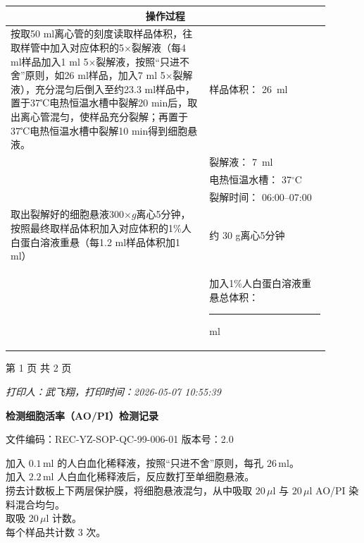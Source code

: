 \documentclass[UTF8,10pt,a4paper,fontset=fandol]{ctexart}
\newcommand{\fieldvalue}[1]{#1}
\newcommand{\handwritten}[1]{#1}
\begin{document}
\begin{tabular}{|p{0.56\linewidth}|p{0.34\linewidth}|}
\hline
\multicolumn{2}{|c|}{操作过程}\\
\hline
按取50 ml离心管的刻度读取样品体积，往取样管中加入对应体积的5$\times$裂解液（每4 ml样品加入1 ml 5$\times$裂解液，按照“只进不舍”原则，如26 ml样品，加入7 ml 5$\times$裂解液），充分混匀后倒入至约23.3 ml样品中，置于37℃电热恒温水槽中裂解20 min后，取出离心管混匀，使样品充分裂解；再置于37℃电热恒温水槽中裂解10 min得到细胞悬液。&
样品体积：
\fieldvalue{\handwritten{26}}\ ml\\
&
裂解液：
\fieldvalue{\handwritten{7}}\ ml\\
&
电热恒温水槽：
\fieldvalue{\handwritten{37}}$^\circ$C\\
&
裂解时间：
\fieldvalue{\handwritten{06:00--07:00}}\\
\hline
取出裂解好的细胞悬液300$\times g$离心5分钟，按照最终取样品体积加入对应体积的1\%人白蛋白溶液重悬（每1.2 ml样品体积加1 ml）&
约
\fieldvalue{\handwritten{30}} g离心5分钟\\
& 加入1\%人白蛋白溶液重悬总体积：\rule{1.5cm}{0.4pt} ml\\
\hline
\end{tabular}

\begin{center}
第 1 页 共 2 页
\end{center}

\textit{打印人：武飞翔，打印时间：2026-05-07 10:55:39}


\newpage

\noindent
\textbf{检测细胞活率（AO/PI）检测记录}

\noindent
文件编码：REC-YZ-SOP-QC-99-006-01 \hfill 版本号：2.0

\medskip

\noindent
加入 $0.1\,\mathrm{ml}$ 的人白血化稀释液，按照“只进不舍”原则，每孔 $26\,\mathrm{ml}$。\\
加入 $2.2\,\mathrm{ml}$ 人白血化稀释液后，反应数打至单细胞悬液。\\
捞去计数板上下两层保护膜，将细胞悬液混匀，从中吸取 $20\,\mu\mathrm{l}$ 与 $20\,\mu\mathrm{l}$ AO/PI 染料混合均匀。\\
取吸
\fieldvalue{\handwritten{$20\,\mu\mathrm{l}$}} 计数。\\
每个样品共计数
\fieldvalue{\handwritten{3}} 次。
\end{document}
